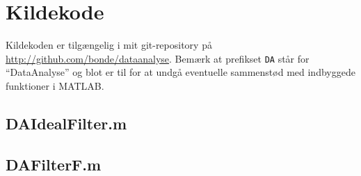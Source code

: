 \documentclass[a4paper, 10pt, danish, final]{article}
\def\repository{\url{http://github.com/bonde/dataanalyse}}
\begin{document}
\section{Kildekode}
Kildekoden er tilgængelig i mit git-repository på \repository{}. Bemærk
at prefikset \texttt{DA} står for ``DataAnalyse'' og blot er til for at
undgå eventuelle sammenstød med indbyggede funktioner i MATLAB.

\subsection{DAIdealFilter.m}


\subsection{DAFilterF.m}

\end{document}
